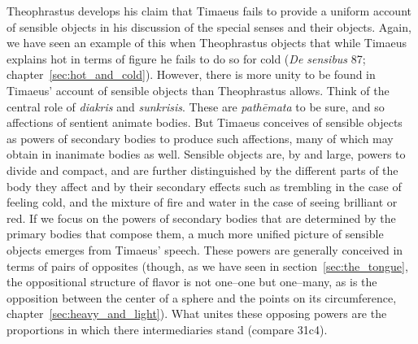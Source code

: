 Theophrastus develops his claim that Timaeus fails to provide a uniform account of sensible objects in his discussion of the special senses and their objects. Again, we have seen an example of this when Theophrastus objects that while Timaeus explains hot in terms of figure he fails to do so for cold (\emph{De sensibus} 87; chapter~\ref{sec:hot_and_cold}). However, there is more unity to be found in Timaeus' account of sensible objects than Theophrastus allows. Think of the central role of \emph{diakris} and \emph{sunkrisis}. These are \emph{pathēmata} to be sure, and so affections of sentient animate bodies. But Timaeus conceives of sensible objects as powers of secondary bodies to produce such affections, many of which may obtain in inanimate bodies as well. Sensible objects are, by and large, powers to divide and compact, and are further distinguished by the different parts of the body they affect and by their secondary effects such as trembling in the case of feeling cold, and the mixture of fire and water in the case of seeing brilliant or red. If we focus on the powers of secondary bodies that are determined by the primary bodies that compose them, a much more unified picture of sensible objects emerges from Timaeus' speech. These powers are generally conceived in terms of pairs of opposites (though, as we have seen in section~\ref{sec:the_tongue}, the oppositional structure of flavor is not one--one but one--many, as is the opposition between the center of a sphere and the points on its circumference, chapter~\ref{sec:heavy_and_light}). What unites these opposing powers are the proportions in which there intermediaries stand (compare 31c4).



